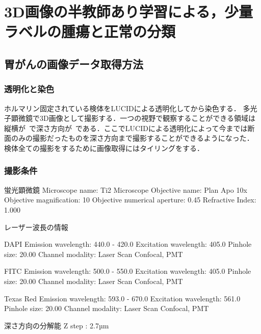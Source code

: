 \chapter{3D画像の半教師あり学習による，少量ラベルの腫瘍と正常の分類}

\section{胃がんの画像データ取得方法}

\subsection{透明化と染色}
ホルマリン固定されている検体をLUCIDによる透明化してから染色する．
多光子顕微鏡で3D画像として撮影する．一つの視野で観察することができる領域は縦横が~で深さ方向が~である．ここでLUCIDによる透明化によって今までは断面のみの撮影だったものを深さ方向まで撮影することができるようになった．
検体全ての撮影をするために画像取得にはタイリングをする．

\subsection*{撮影条件}
蛍光顕微鏡
Microscope name: Ti2 Microscope
Objective name: Plan Apo 10x
Objective magnification: 10
Objective numerical aperture: 0.45
Refractive Index: 1.000


レーザー波長の情報

DAPI
Emission wavelength: 440.0 - 420.0
Excitation wavelength: 405.0
Pinhole size: 20.00
Channel modality: Laser Scan Confocal, PMT

FITC
Emission wavelength: 500.0 - 550.0
Excitation wavelength: 405.0
Pinhole size: 20.00
Channel modality: Laser Scan Confocal, PMT

Texas Red
Emission wavelength: 593.0 - 670.0
Excitation wavelength: 561.0
Pinhole size: 20.00
Channel modality: Laser Scan Confocal, PMT

深さ方向の分解能
Z step : 2.7µm


